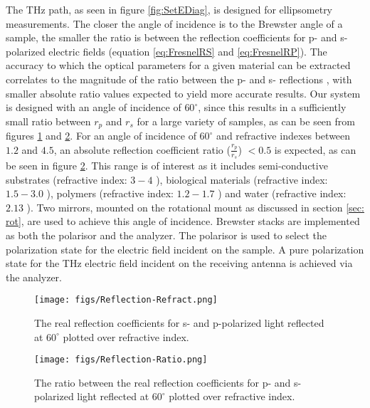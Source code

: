 The THz path, as seen in figure \ref{fig:SetEDiag}, is designed for ellipsometry measurements. The closer the angle of incidence is to the Brewster angle of a sample, the smaller the ratio is between the reflection coefficients for p- and s-polarized electric fields (equation \ref{eq:FresnelRS} and \ref{eq:FresnelRP}). The accuracy to which the optical parameters for a given material can be extracted correlates to the magnitude of the ratio between the p- and s- reflections \cite{Neshat2013}, with smaller absolute ratio values expected to yield more accurate results. Our system is designed with an angle of incidence of $60^{\circ}$, since this results in a sufficiently small ratio between $r_{p}$ and $r_{s}$ for a large variety of samples, as can be seen from figures \ref{fig:RefDif} and \ref{fig:RefRat}. For an angle of incidence of $60^{\circ}$ and refractive indexes between $1.2$ and $4.5$, an absolute reflection coefficient ratio ($\frac{r_{p}}{r_{s}}$) $<0.5$ is expected, as can be seen in figure \ref{fig:RefRat}. This range is of interest as it includes semi-conductive substrates (refractive index: $3-4$ \cite{Li-2008}), biological materials (refractive index: $1.5-3.0$ \cite{Charkhesht2018,Novelli2017, Shin2018}), polymers (refractive index: $1.2-1.7$ \cite{Sommer2018, Yamada2016, Cunningham2011}) and water (refractive index: $2.13$ \cite{rii}). Two mirrors, mounted on the rotational mount as discussed in section \ref{sec: rot},  are used to achieve this angle of incidence. Brewster stacks are implemented as both the polarisor and the analyzer. The polarisor is used to select the polarization state for the electric field incident on the sample. A pure polarization state for the THz electric field incident on the receiving antenna is achieved via the analyzer.

\begin{figure}[H]
\begin{center}
	 \texttt{[image: figs/Reflection-Refract.png]}
	 \caption[S- and P-reflection coefficient at $60^{\circ}$ over refractive index]{The real reflection coefficients for s- and p-polarized light reflected at $60^{\circ}$ plotted over refractive index.}
   \label{fig:RefDif}
\end{center}
\end{figure}

\begin{figure}[H]
\begin{center}
	 \texttt{[image: figs/Reflection-Ratio.png]}
	 \caption[Ratio between p- and s-reflection coefficient at $60^{\circ}$ over refractive index]{The ratio between the real reflection coefficients for p- and s-polarized light reflected at $60^{\circ}$ plotted over refractive index.}
   \label{fig:RefRat}
\end{center}
\end{figure}


